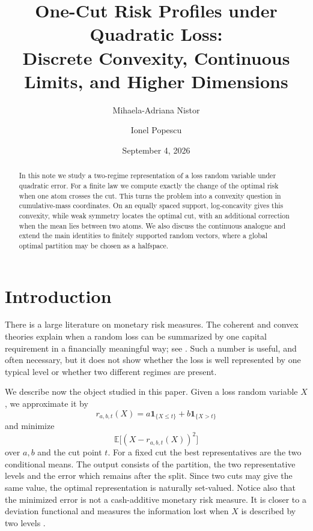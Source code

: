 \documentclass[a4paper]{amsart}
\title[Quadratic one-cut risk profiles]{One-Cut Risk Profiles under Quadratic Loss:\\
Discrete Convexity, Continuous Limits, and Higher Dimensions}
\author{Mihaela-Adriana Nistor}
\author{Ionel Popescu}
\date{September 4, 2026}
\numberwithin{equation}{section}
\theoremstyle{remark}
\newcommand{\E}{\mathbb E}
\newcommand{\1}{\mathbf 1}
\begin{document}
\raggedbottom

\begin{abstract}
In this note we study a two-regime representation of a loss random variable
under quadratic error.  For a finite law we compute exactly the change of the
optimal risk when one atom crosses the cut.  This turns the problem into a
convexity question in cumulative-mass coordinates.  On an equally spaced
support, log-concavity gives this convexity, while weak symmetry locates the
optimal cut, with an additional correction when the mean lies between two
atoms.  We also discuss the continuous analogue and extend the main identities
to finitely supported random vectors, where a global optimal partition may be
chosen as a halfspace.
\end{abstract}

\maketitle

\section{Introduction}\label{sec:introduction}

There is a large literature on monetary risk measures.  The coherent and
convex theories explain when a random loss can be summarized by one capital
requirement in a financially meaningful way; see
\cite{artzner-delbaen-eber-heath,frittelli-rosazza,foellmer-weber}.  Such a
number is useful, and often necessary, but it does not show whether the loss is
well represented by one typical level or whether two different regimes are
present.

We describe now the object studied in this paper.  Given a loss random
variable $X$, we approximate it by
\[
 r_{a,b,t}(X)=a\1_{\{X\leq t\}}+b\1_{\{X>t\}}
\]
and minimize
\begin{equation}\label{eq:basic-objective}
 \E\bigl[(X-r_{a,b,t}(X))^2\bigr]
\end{equation}
over $a,b$ and the cut point $t$.  For a fixed cut the best representatives are
the two conditional means.  The output consists of the partition, the two
representative levels and the error which remains after the split.  Since two
cuts may give the same value, the optimal representation is naturally
set-valued.  Notice also that the minimized error is not a cash-additive
monetary risk measure.  It is closer to a deviation functional and measures
the information lost when $X$ is described by two levels
\cite{rockafellar-uryasev-zabarankin-2006}.
\end{document}
